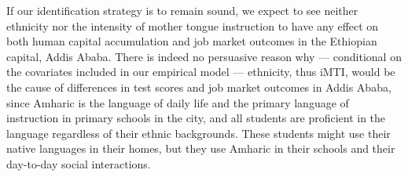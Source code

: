 If our identification strategy is to remain sound, we expect to see neither ethnicity nor the intensity of mother tongue instruction to have any effect on both human capital accumulation and job market outcomes in the Ethiopian capital, Addis Ababa. There is indeed no persuasive reason why --- conditional on the covariates included in our empirical model --- ethnicity, thus iMTI, would be the cause of differences in test scores and job market outcomes in Addis Ababa, since Amharic is the language of daily life and the primary language of instruction in primary schools in the city, and all students are proficient in the language regardless of their ethnic backgrounds. These students might use their native languages in their homes, but they use Amharic in their schools and their day-to-day social interactions.
































